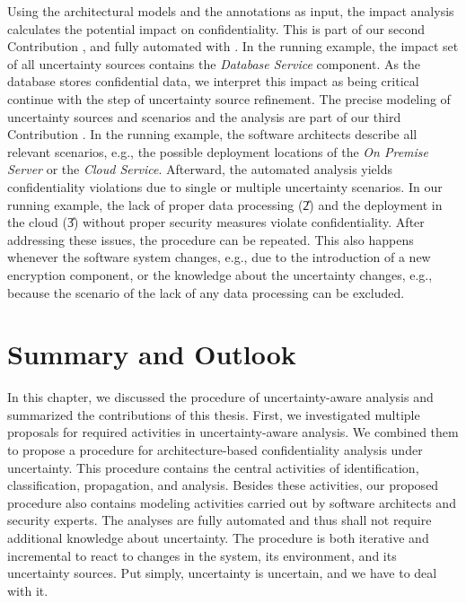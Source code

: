 Using the architectural models and the annotations as input, the impact analysis calculates the potential impact on confidentiality.
This is part of our second Contribution , and fully automated with \uia.
In the running example, the impact set of all uncertainty sources contains the \emph{Database Service} component.
As the database stores confidential data, we interpret this impact as being critical continue with the step of uncertainty source refinement.
The precise modeling of uncertainty sources and scenarios and the analysis are part of our third Contribution .
In the running example, the software architects describe all relevant scenarios, e.g., the possible deployment locations of the \emph{On Premise Server} or the \emph{Cloud Service}.
Afterward, the automated analysis \abunai yields confidentiality violations due to single or multiple uncertainty scenarios.
In our running example, the lack of proper data processing (\U{2}) and the deployment in the cloud (\U{3}) without proper security measures violate confidentiality.
After addressing these issues, the procedure can be repeated.
This also happens whenever the software system changes, e.g., due to the introduction of a new encryption component, or the knowledge about the uncertainty changes, e.g., because the scenario of the lack of any data processing can be excluded.





\section{Summary and Outlook}%
\label{sec:overview:summary}

In this chapter, we discussed the procedure of uncertainty-aware analysis and summarized the contributions of this thesis.
First, we investigated multiple proposals for required activities in uncertainty-aware analysis.
We combined them to propose a procedure for architecture-based confidentiality analysis under uncertainty.
This procedure contains the central activities of identification, classification, propagation, and analysis.
Besides these activities, our proposed procedure also contains modeling activities carried out by software architects and security experts.
The analyses are fully automated and thus shall not require additional knowledge about uncertainty.
The procedure is both iterative and incremental to react to changes in the system, its environment, and its uncertainty sources.
Put simply, uncertainty is uncertain, and we have to deal with it.

